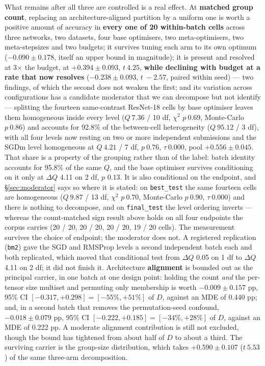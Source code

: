 \documentclass[10pt,letterpaper]{article}
\newcommand{\Dstat}{D}                         %
\newcommand{\arm}[1]{\texttt{#1}}
\begin{document}
What remains after all three are controlled is a real effect. At \textbf{matched group count},
replacing an architecture-aligned partition by a uniform one is worth a positive amount of accuracy
in \textbf{every one of 20 within-batch cells} across three networks, two datasets, four base
optimisers, two meta-optimisers, two meta-stepsizes and two budgets; it survives tuning each arm to
its own optimum
($-0.090 \pm 0.178$, itself an upper bound in magnitude); it is present and resolved at
3$\times$ the budget, at $+0.394 \pm 0.093$, $t\ 4.25$, \textbf{while declining with budget at a
rate that now resolves} ($-0.238 \pm 0.093$, $t\ -2.57$, paired within seed) --- two findings,
of which the second does not weaken the first; and its variation across configurations has a candidate moderator that we
can decompose but not identify --- splitting the fourteen same-contrast ResNet-18 cells by base
optimiser leaves them homogeneous inside every level ($Q\ 7.36$ / 10 df, $\chi^2$ $p\ 0.69$,
Monte-Carlo $p\ 0.86$) and accounts
for 92.8\% of the between-cell heterogeneity ($Q\ 95.12$ / 3 df), with all four levels now resting
on two or more independent submissions and the SGDm level homogeneous at $Q\ 4.21$ / 7 df,
$p\ 0.76$, $\tau\ 0.000$, pool $+0.556 \pm 0.045$. That share is a property of the grouping rather
than of the label: batch identity accounts for 95.8\% of the same $Q$, and the base optimiser
survives conditioning on it only at $\Delta Q$ 4.11 on 2 df, $p$ 0.13. It is also conditional on
the endpoint, and \S\ref{sec:moderator} says so where it is stated: on \texttt{best\_test} the
same fourteen cells are homogeneous ($Q\ 9.87$ / 13 df, $\chi^2$ $p\ 0.70$, Monte-Carlo
$p\ 0.90$, $\tau\ 0.000$) and there is
nothing to decompose, and on \texttt{final\_test} the level ordering inverts --- whereas the
count-matched sign result above holds on all four endpoints the corpus carries (20 / 20, 20 / 20,
20 / 20, 19 / 20 cells). The measurement survives the choice of endpoint; the moderator does not.
A registered replication
(\arm{bm2}) gave the SGD and RMSProp levels a second independent batch each and both replicated,
which moved that conditional test from $\Delta Q$ 0.05 on 1 df to $\Delta Q$ 4.11 on 2 df; it did
not finish it. Architecture \textbf{alignment} is bounded out as the principal carrier, in one
batch at one design point: holding the count \emph{and} the per-tensor size multiset and permuting
only membership is worth $-0.009 \pm 0.157$ pp, 95\% CI
$[-0.317, +0.298] = [-55\%, +51\%]$ of $\Dstat$, against an MDE of 0.440 pp; and, in a second batch
that removes the permutation-seed confound, $-0.018 \pm 0.079$ pp, 95\% CI
$[-0.222, +0.185] = [-34\%, +28\%]$ of $\Dstat$, against an MDE of 0.222 pp. A moderate alignment
contribution is still not excluded, though the bound has tightened from about half of $\Dstat$ to
about a third. The surviving
carrier is the group-size distribution, which takes $+0.590 \pm 0.107$ ($t\ 5.53$) of the same
three-arm decomposition.
\end{document}
